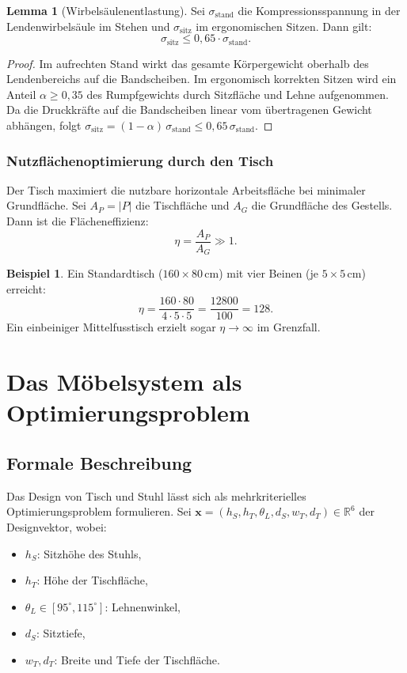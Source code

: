 ﻿\documentclass[a4paper,12pt]{article}
\theoremstyle{definition}
\newtheorem{beispiel}{Beispiel}
\newtheorem{lemma}{Lemma}
\begin{document}
\begin{lemma}[Wirbels\"{a}ulenentlastung]
\label{lem:entlastung}
	Sei $\sigma_{\mathrm{stand}}$ die Kompressionsspannung in der Lendenwirbels\"{a}ule im
	Stehen und $\sigma_{\mathrm{sitz}}$ im ergonomischen Sitzen. Dann gilt:
	\[
		\sigma_{\mathrm{sitz}} \leq 0{,}65 \cdot \sigma_{\mathrm{stand}}.
	\]
\end{lemma}

\begin{proof}
	Im aufrechten Stand wirkt das gesamte K\"{o}rpergewicht oberhalb des Lendenbereichs auf
	die Bandscheiben. Im ergonomisch korrekten Sitzen wird ein Anteil $\alpha \geq 0{,}35$
	des Rumpfgewichts durch Sitzfl\"{a}che und Lehne aufgenommen. Da die Druckkr\"{a}fte auf die
	Bandscheiben linear vom \"{u}bertragenen Gewicht abh\"{a}ngen, folgt
	$\sigma_{\mathrm{sitz}} = (1 - \alpha)\,\sigma_{\mathrm{stand}} \leq 0{,}65\,\sigma_{\mathrm{stand}}$.
\end{proof}

\subsubsection{Nutzfl\"{a}chenoptimierung durch den Tisch}

Der Tisch maximiert die nutzbare horizontale Arbeitsfl\"{a}che bei minimaler Grundfl\"{a}che.
Sei $A_P = |P|$ die Tischfl\"{a}che und $A_G$ die Grundfl\"{a}che des Gestells. Dann ist die
Fl\"{a}cheneffizienz:
\[
	\eta = \frac{A_P}{A_G} \gg 1.
\]

\begin{beispiel}
	Ein Standardtisch ($160 \times 80\,\mathrm{cm}$) mit vier Beinen (je $5 \times 5\,\mathrm{cm}$)
	erreicht:
	\[
		\eta = \frac{160 \cdot 80}{4 \cdot 5 \cdot 5} = \frac{12800}{100} = 128.
	\]
	Ein einbeiniger Mittelfusstisch erzielt sogar $\eta \to \infty$ im Grenzfall.
\end{beispiel}

\section{Das M\"{o}belsystem als Optimierungsproblem}

\subsection{Formale Beschreibung}

Das Design von Tisch und Stuhl l\"{a}sst sich als mehrkriterielles Optimierungsproblem
formulieren. Sei $\mathbf{x} = (h_S, h_T, \theta_L, d_S, w_T, d_T) \in \mathbb{R}^6$
der Designvektor, wobei:
\begin{itemize}
	\item $h_S$: Sitzh\"{o}he des Stuhls,
	\item $h_T$: H\"{o}he der Tischfl\"{a}che,
	\item $\theta_L \in [95^{\circ}, 115^{\circ}]$: Lehnenwinkel,
	\item $d_S$: Sitztiefe,
	\item $w_T, d_T$: Breite und Tiefe der Tischfl\"{a}che.
\end{itemize}
\end{document}
